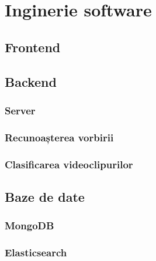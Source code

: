 \chapter{Inginerie software}

\section{Frontend}

\section{Backend}
\subsection{Server}
\subsection{Recunoașterea vorbirii}
\subsection{Clasificarea videoclipurilor}

\section{Baze de date}

\subsection{MongoDB}
\subsection{Elasticsearch}
